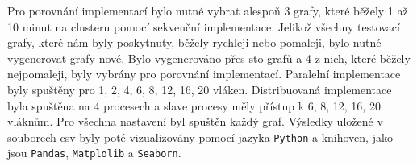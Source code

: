 Pro porovnání implementací bylo nutné vybrat alespoň 3 grafy, které běžely 1 až 10 minut na clusteru pomocí sekvenční implementace.
Jelikož všechny testovací grafy, které nám byly poskytnuty, běžely rychleji nebo pomaleji, bylo nutné vygenerovat grafy nové.
Bylo vygenerováno přes sto grafů a 4 z nich, které běžely nejpomaleji, byly vybrány pro porovnání implementací.
Paralelní implementace byly spuštěny pro 1, 2, 4, 6, 8, 12, 16, 20 vláken.
Distribuovaná implementace byla spuštěna na 4 procesech a slave procesy měly přístup k 6, 8, 12, 16, 20 vláknům.
Pro všechna nastavení byl spuštěn každý graf.
Výsledky uložené v souborech csv byly poté vizualizovány pomocí jazyka \texttt{Python} a knihoven, jako jsou \texttt{Pandas}, \texttt{Matplolib} a \texttt{Seaborn}.

